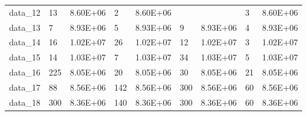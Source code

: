 \begin{table}[!h]
\begin{tabular}{lllllllll}
data\_12 & 13                                       & 8.60E+06                                     & 2                                         & 8.60E+06                                      &                                           &                                              & 3                                         & 8.60E+06                                     \\
data\_13 & 7                                        & 8.93E+06                                     & 5                                         & 8.93E+06                                      & 9                                         & 8.93E+06                                     & 4                                         & 8.93E+06                                     \\
data\_14 & 16                                       & 1.02E+07                                     & 26                                        & 1.02E+07                                      & 12                                        & 1.02E+07                                     & 3                                         & 1.02E+07                                     \\
data\_15 & 14                                       & 1.03E+07                                     & 7                                         & 1.03E+07                                      & 34                                        & 1.03E+07                                     & 5                                         & 1.03E+07                                     \\
data\_16 & 225                                      & 8.05E+06                                     & 20                                        & 8.05E+06                                      & 30                                        & 8.05E+06                                     & 21                                        & 8.05E+06                                     \\
data\_17 & 88                                       & 8.56E+06                                     & 142                                       & 8.56E+06                                      & 300                                       & 8.56E+06                                     & 60                                        & 8.56E+06                                     \\
data\_18 & 300                                      & 8.36E+06                                     & 140                                       & 8.36E+06                                      & 300                                       & 8.36E+06                                     & 60                                        & 8.36E+06                                     \\

\end{tabular}
\end{table}
